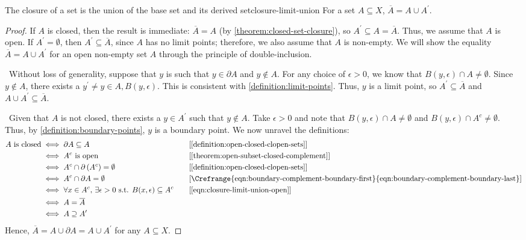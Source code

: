 \documentclass{article}
\newcommand*\iffforward{\par\boxed\Longrightarrow\ }
\newcommand*\iffbackward{\par\boxed\Longleftarrow\ }
\numberwithin{equation}{section}
\numberwithin{figure}{section}
\begin{document}
\begin{theorem}{The closure of a set is the union of the base set and its
        derived set}{closure-limit-union}
    For a set $ A \subseteq X $, $ \overline{A} = A \cup A^\prime $.
    \begin{proof}
        If $ A $ is closed, then the result is immediate: $ \overline{A} = A $
        (by \cref{theorem:closed-set-closure}), so $ A^\prime \subseteq A =
        \overline{A} $. Thus, we assume that $ A $ is open. If $ A^\prime =
        \emptyset $, then $ A^\prime \subseteq \overline{A} $, since $ A $ has
        no limit points; therefore, we also assume that $ A $ is non-empty. We
        will show the equality $ \overline{A} = A \cup A^\prime $ for an open
        non-empty set $ A $ through the principle of double-inclusion.

        \iffforward Without loss of generality, suppose that $ y $ is such that
        $ y \in \partial A $ and $ y \not\in A $. For any choice of $ \epsilon >
        0 $, we know that $ B(y, \epsilon) \cap A \neq \emptyset $. Since $ y
        \not\in A $, there exists a $ y^\prime \neq y \in A, B(y, \epsilon) $.
        This is consistent with \cref{definition:limit-points}. Thus, $ y $ is a
        limit point, so $ A^\prime \subseteq \overline{A} $ and $ A \cup
        A^\prime \subseteq \overline{A} $.

        \iffbackward Given that $ A $ is not closed, there exists a $ y \in
        A^\prime $ such that $ y \not\in A $. Take $ \epsilon > 0 $ and note
        that $ B(y, \epsilon) \cap A \neq \emptyset $ and $ B(y, \epsilon) \cap
        A^c \neq \emptyset $. Thus, by \cref{definition:boundary-points}, $ y $
        is a boundary point. We now unravel the definitions:
        \begin{alignat}{2}
            A \text{ is closed} &\iff \partial A \subseteq A
                &&\text{[\Cref{definition:open-closed-clopen-sets}]} \\
            &\iff A^c \text{ is open}
                &&\text{[\Cref{theorem:open-subset-closed-complement}]}%
                \label{eqn:closure-limit-union-open} \\
            &\iff A^c \cap \partial \left( A^c \right) = \emptyset
                &&\text{[\Cref{definition:open-closed-clopen-sets}]} \\
            &\iff A^c \cap \partial A = \emptyset
                &&\text{[\Crefrange{eqn:boundary-complement-boundary-first}%
                    {eqn:boundary-complement-boundary-last}]} \\
            &\iff \forall x \in A^c,\, \exists \epsilon > 0 \text{ s.t. }
                B(x, \epsilon) \subseteq A^c\quad
                &&\text{[\Cref{eqn:closure-limit-union-open}]} \\
            &\iff A = \overline{A} \\
            &\iff A \supseteq A^\prime
        \end{alignat}
        Hence, $ \overline{A} = A \cup \partial A = A \cup A^\prime $ for any
        $ A \subseteq X $.
    \end{proof}
\end{theorem}
\end{document}
